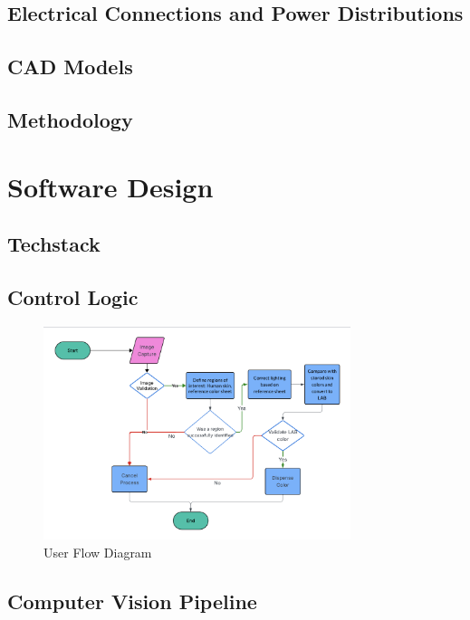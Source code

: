 \documentclass[12pt, letterpaper]{report}
\begin{document}
    \section{Electrical Connections and Power Distributions}

    \section{CAD Models}

    \section{Methodology}



    \chapter{Software Design}

    \section{Techstack}

    \section{Control Logic}
    \begin{figure}[H]
        \centering
        \includegraphics[width=0.8\textwidth]{assets/userflow.png}
        \caption{User Flow Diagram}
    \end{figure}

    \section{Computer Vision Pipeline}
\end{document}
